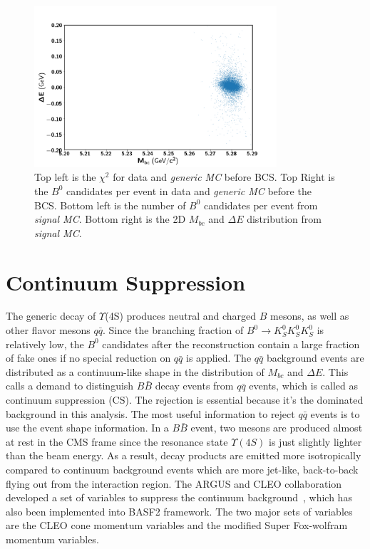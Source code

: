 \begin{figure}[htpb]
\begin{minipage}[b]{0.5\linewidth}
	\end{minipage}
	\begin{minipage}[b]{0.5\linewidth}
		\centering 
		\includegraphics[width=1\linewidth, height=6cm]{figures/hist_sig_MC_Mbc_dE}
		
	\end{minipage}
	
	\caption{Top left is the $\chi^2$ for data and \textit{generic MC} before BCS. Top Right is the $B^0$ candidates per event in data and \textit{generic MC} before the BCS. Bottom left is the number of $B^0$ candidates per event from \textit{signal MC}. Bottom right is the 2D $M_{bc}$ and $\Delta E$ distribution from \textit{signal MC}.}
	\label{fig:b0dist}
\end{figure}
\section{Continuum Suppression}
The generic decay of $\Upsilon$(4S) produces neutral and charged $B$ mesons, as well as other flavor mesons $q\bar{q}$. Since the branching fraction of $B^0 \to K_S^0  K_S^0  K_S^0$ is relatively low, the $B^0$ candidates after the reconstruction contain a large fraction of fake ones if no special reduction on $q\bar{q}$ is applied. 
The $q\bar{q}$ background events are distributed as a continuum-like shape in the distribution of $M_{bc}$ and $\Delta E$. This calls a demand to distinguish $B\bar{B}$ decay events from $q\bar{q}$ events, which is called as continuum suppression (CS). The rejection is essential because it's the dominated background in this analysis. The most useful information to reject $q\bar{q}$ events is to use the event shape information. In a $B\bar{B}$ event, two mesons are produced almost at rest in the CMS frame since the resonance state $\Upsilon(4S)$ is just slightly lighter than the beam energy. As a result, decay products are emitted more isotropically compared to continuum background events which are more jet-like, back-to-back flying out from the interaction region. The ARGUS and CLEO collaboration developed a set of variables to suppress the continuum background~\cite{Bevan_2014}, which has also been implemented into BASF2 framework. The two major sets of variables are the CLEO cone momentum variables and the modified Super Fox-wolfram momentum variables.

